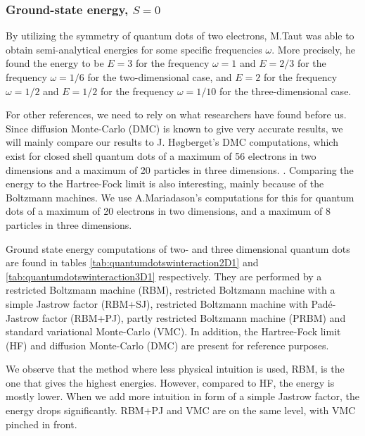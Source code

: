 \subsubsection{Ground-state energy, $S=0$}
By utilizing the symmetry of quantum dots of two electrons, M.Taut was able to obtain semi-analytical energies for some specific frequencies $\omega$. More precisely, he found the energy to be $E=3$ for the frequency $\omega=1$ and $E=2/3$ for the frequency $\omega=1/6$ for the two-dimensional case, and $E=2$ for the frequency $\omega=1/2$ and $E=1/2$ for the frequency $\omega=1/10$ for the three-dimensional case. \cite{taut_two_1993}\cite{taut_two_1994}

For other references, we need to rely on what researchers have found before us. Since diffusion Monte-Carlo (DMC) is known to give very accurate results, we will mainly compare our results to J. Høgberget's DMC computations, which exist for closed shell quantum dots of a maximum of 56 electrons in two dimensions and a maximum of 20 particles in three dimensions. \cite{hogberget_quantum_2013}. Comparing the energy to the Hartree-Fock limit is also interesting, mainly because of the Boltzmann machines. We use A.Mariadason's computations for this for quantum dots of a maximum of 20 electrons in two dimensions, and a maximum of 8 particles in three dimensions. \cite{mariadason_quantum_2018}

Ground state energy computations of two- and three dimensional quantum dots are found in tables \eqref{tab:quantumdotswinteraction2D1} and \eqref{tab:quantumdotswinteraction3D1} respectively. They are performed by a restricted Boltzmann machine (RBM), restricted Boltzmann machine with a simple Jastrow factor (RBM+SJ), restricted Boltzmann machine with Padé-Jastrow factor (RBM+PJ), partly restricted Boltzmann machine (PRBM) and standard variational Monte-Carlo (VMC). In addition, the Hartree-Fock limit (HF) and diffusion Monte-Carlo (DMC) are present for reference purposes. 

We observe that the method where less physical intuition is used, RBM, is the one that gives the highest energies. However, compared to HF, the energy is mostly lower. When we add more intuition in form of a simple Jastrow factor, the energy drops significantly. RBM+PJ and VMC are on the same level, with VMC pinched in front.

